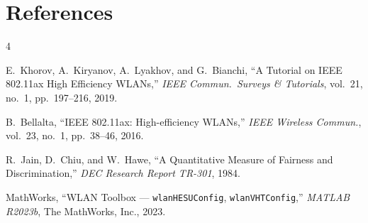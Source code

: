 \documentclass[twocolumn]{article}
\begin{document}
\section{References}

{\footnotesize
\begin{thebibliography}{4}
\setlength{\itemsep}{1pt}
\setlength{\parsep}{0pt}

E.~Khorov, A.~Kiryanov, A.~Lyakhov, and G.~Bianchi,
``A Tutorial on IEEE 802.11ax High Efficiency WLANs,''
\textit{IEEE Commun.\ Surveys \& Tutorials}, vol.~21, no.~1,
pp.~197--216, 2019.

B.~Bellalta,
``IEEE 802.11ax: High-efficiency WLANs,''
\textit{IEEE Wireless Commun.}, vol.~23, no.~1, pp.~38--46, 2016.

R.~Jain, D.~Chiu, and W.~Hawe,
``A Quantitative Measure of Fairness and Discrimination,''
\textit{DEC Research Report TR-301}, 1984.

MathWorks,
``WLAN Toolbox --- \texttt{wlanHESUConfig}, \texttt{wlanVHTConfig},''
\textit{MATLAB R2023b}, The MathWorks, Inc., 2023.

\end{thebibliography}
}
\end{document}
